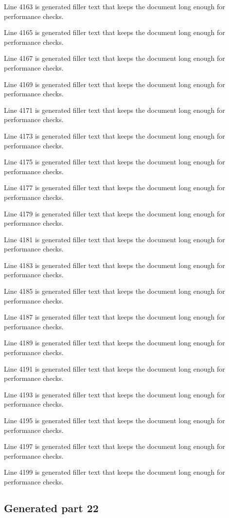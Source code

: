 Line 4163 is generated filler text that keeps the document long enough for performance checks.

Line 4165 is generated filler text that keeps the document long enough for performance checks.

Line 4167 is generated filler text that keeps the document long enough for performance checks.

Line 4169 is generated filler text that keeps the document long enough for performance checks.

Line 4171 is generated filler text that keeps the document long enough for performance checks.

Line 4173 is generated filler text that keeps the document long enough for performance checks.

Line 4175 is generated filler text that keeps the document long enough for performance checks.

Line 4177 is generated filler text that keeps the document long enough for performance checks.

Line 4179 is generated filler text that keeps the document long enough for performance checks.

Line 4181 is generated filler text that keeps the document long enough for performance checks.

Line 4183 is generated filler text that keeps the document long enough for performance checks.

Line 4185 is generated filler text that keeps the document long enough for performance checks.

Line 4187 is generated filler text that keeps the document long enough for performance checks.

Line 4189 is generated filler text that keeps the document long enough for performance checks.

Line 4191 is generated filler text that keeps the document long enough for performance checks.

Line 4193 is generated filler text that keeps the document long enough for performance checks.

Line 4195 is generated filler text that keeps the document long enough for performance checks.

Line 4197 is generated filler text that keeps the document long enough for performance checks.

Line 4199 is generated filler text that keeps the document long enough for performance checks.

\subsection{Generated part 22}

